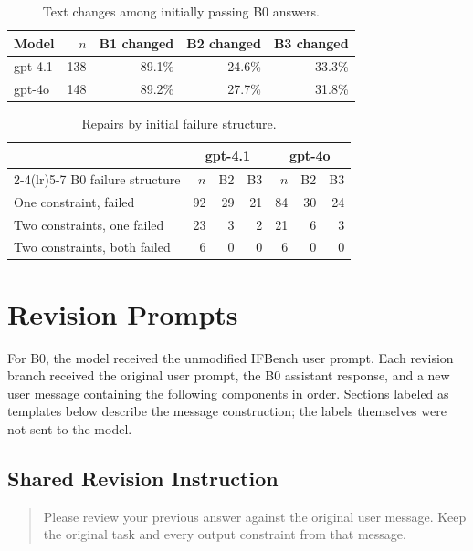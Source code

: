 \begin{table}[!t]
\caption{Text changes among initially passing B0 answers.}
\label{tab:text-changes}
\centering\footnotesize
\begin{tabular}{lrrrr}
\toprule
Model & $n$ & B1 changed & B2 changed & B3 changed \\
\midrule
gpt-4.1 & 138 & 89.1\% & 24.6\% & 33.3\% \\
gpt-4o & 148 & 89.2\% & 27.7\% & 31.8\% \\
\bottomrule
\end{tabular}
\end{table}

\begin{table}[!t]
\caption{Repairs by initial failure structure.}
\label{tab:failure-structure}
\centering\scriptsize
\begin{tabular}{lrrrrrr}
\toprule
& \multicolumn{3}{c}{gpt-4.1} & \multicolumn{3}{c}{gpt-4o} \\
\cmidrule(lr){2-4}\cmidrule(lr){5-7}
B0 failure structure & $n$ & B2 & B3 & $n$ & B2 & B3 \\
\midrule
One constraint, failed & 92 & 29 & 21 & 84 & 30 & 24 \\
Two constraints, one failed & 23 & 3 & 2 & 21 & 6 & 3 \\
Two constraints, both failed & 6 & 0 & 0 & 6 & 0 & 0 \\
\bottomrule
\end{tabular}
\end{table}

\section{Revision Prompts}
\label{app:prompts}
For B0, the model received the unmodified IFBench user prompt. Each revision branch received the original user prompt, the B0 assistant response, and a new user message containing the following components in order. Sections labeled as templates below describe the message construction; the labels themselves were not sent to the model.

\subsection{Shared Revision Instruction}

\begin{quote}
Please review your previous answer against the original user message. Keep the original task and every output constraint from that message.
\end{quote}

